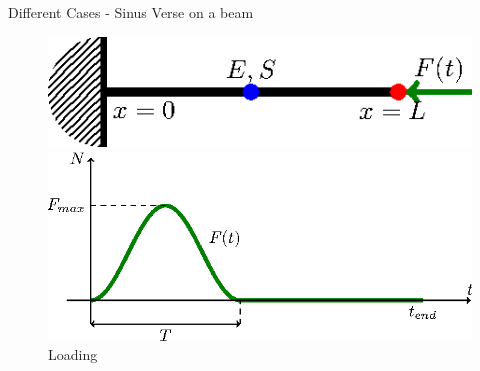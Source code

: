 \documentclass[10pt,a4paper]{beamer}
\begin{document}
\begin{frame}{Different Cases - Sinus Verse on a beam} 
	\begin{figure}
		\begin{minipage}[b]{0.4\linewidth}
			\includegraphics[width=1\linewidth]{Beam.tikz.eps}
			\caption{Beam Problem}
		\end{minipage}
		 \hspace{1cm}
		\begin{minipage}[b]{0.4\linewidth}
			\includegraphics[width=1\linewidth]{SinVerse.tikz.eps}
			\caption{Loading}
		\end{minipage}
	\end{figure}
\end{frame}
\end{document}
